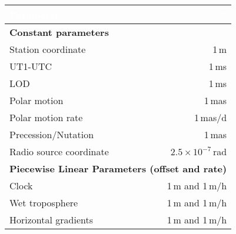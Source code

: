 \color{black}
\setlength{\extrarowheight}{10pt}
\begin{tabularx}{\columnwidth}{X|r}
\hline
\rowcolor{kvgreen}\textcolor{white}{\textbf{Parameter}} & \textcolor{white}{$\sigma$} \\
\hline
\multicolumn{2}{l}{\textbf{Constant parameters}} \\
\hline
Station coordinate      & 1\,m \\
UT1-UTC                 & 1\,ms \\
LOD                     & 1\,ms \\
Polar motion            & 1\,mas \\
Polar motion rate       & 1\,mas/d \\
Precession/Nutation     & 1\,mas \\
Radio source coordinate & $2.5\times 10^{-7}$\,rad \\
\hline
\multicolumn{2}{l}{\textbf{Piecewise Linear Parameters (offset and rate)}} \\
\hline
Clock                   & 1\,m and 1\,m/h\\
Wet troposphere         & 1\,m and 1\,m/h \\
Horizontal gradients    & 1\,m and 1\,m/h \\
\hline
\end{tabularx}

\endinput
